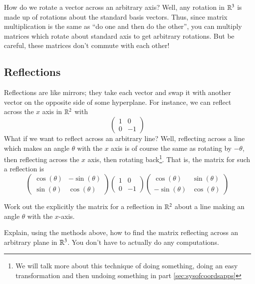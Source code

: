 How do we rotate a vector across an arbitrary axis?
Well, any rotation in $\mathbb{R}^3$ is made up of rotations about the standard basis vectors.
Thus, since matrix multiplication is the same as ``do one and then do the other'', you can multiply matrices which rotate about standard axis to get arbitrary rotations.
But be careful, these matrices don't commute with each other!

\subsection{Reflections}

Reflections are like mirrors; they take each vector and swap it with another vector on the opposite side of some hyperplane.
For instance, we can reflect across the $x$ axis in $\mathbb{R}^2$ with
\[\left(\begin{array}{cc} 1 & 0 \\ 0 & -1\end{array}\right)\]
What if we want to reflect across an arbitrary line?
Well, reflecting across a line which makes an angle $\theta$ with the $x$ axis is of course the same as rotating by $-\theta$, then reflecting across the $x$ axis, then rotating back\footnote{We will talk more about this technique of doing something, doing an easy transformation and then undoing something in part \ref{sec:sysofcoordsapps}}.  
That is, the matrix for such a reflection is
\[\left(\begin{array}{cc} \cos(\theta) & -\sin(\theta) \\ \sin(\theta) & \cos(\theta)\end{array}\right)\left(\begin{array}{cc} 1 & 0 \\ 0 & -1\end{array}\right)
\left(\begin{array}{cc} \cos(\theta) & \sin(\theta) \\ -\sin(\theta) & \cos(\theta)\end{array}\right)\]
\begin{Ex}
  Work out the explicitly the matrix for a reflection in $\mathbb{R}^2$ about a line making an angle $\theta$ with the $x$-axis.  
\end{Ex}
\begin{ImpEx}
  Explain, using the methods above, how to find the matrix reflecting across an arbitrary plane in $\mathbb{R}^3$.
  You don't have to actually do any computations.  
\end{ImpEx}

